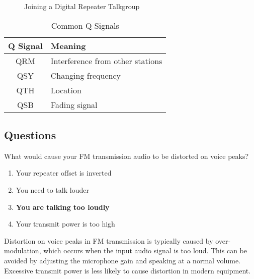 \begin{figure}[h]
    \centering
    \caption{Joining a Digital Repeater Talkgroup}
    \label{fig:talkgroup}
\end{figure}

\begin{table}[h]
    \centering
    \begin{tabular}{|c|l|}
        \hline
        \textbf{Q Signal} & \textbf{Meaning} \\
        \hline
        QRM & Interference from other stations \\
        QSY & Changing frequency \\
        QTH & Location \\
        QSB & Fading signal \\
        \hline
    \end{tabular}
    \caption{Common Q Signals}
    \label{tab:q_signals}
\end{table}

\subsection*{Questions}
\begin{tcolorbox}[colback=gray!10!white,colframe=black!75!black,title={T2B05}]
    What would cause your FM transmission audio to be distorted on voice peaks?
    \begin{enumerate}[label=\Alph*,noitemsep]
        \item Your repeater offset is inverted
        \item You need to talk louder
        \item \textbf{You are talking too loudly}
        \item Your transmit power is too high
    \end{enumerate}
\end{tcolorbox}
Distortion on voice peaks in FM transmission is typically caused by over-modulation, which occurs when the input audio signal is too loud. This can be avoided by adjusting the microphone gain and speaking at a normal volume. Excessive transmit power is less likely to cause distortion in modern equipment.


